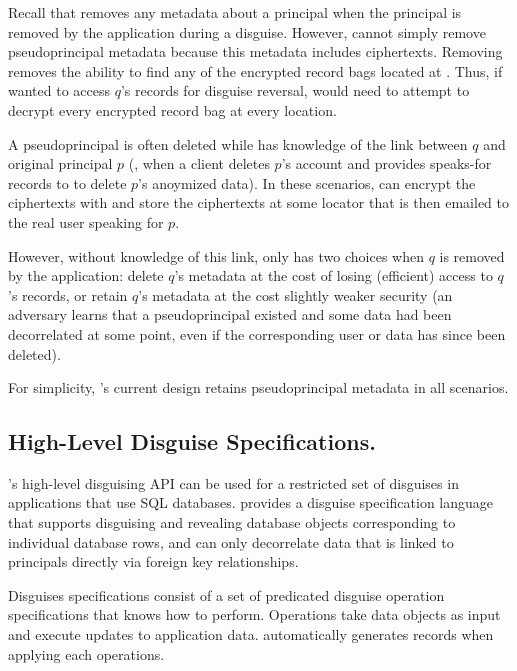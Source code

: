 
Recall that \sys removes any metadata about a principal when the principal is removed by the
application during a disguise.
However, \sys cannot simply remove pseudoprincipal metadata because this metadata includes 
ciphertexts. Removing  removes the ability to find any of the encrypted record bags
located at . Thus, if \sys wanted to access $q$'s records for \eg disguise reversal, \sys
would need to attempt to decrypt every encrypted record bag at every location.

A pseudoprincipal is often deleted while \sys has knowledge of the link between $q$ and
original principal $p$ (\eg, when a client deletes $p$'s account and provides speaks-for records
to \sys to delete $p$'s anoymized data). In these scenarios, \sys can encrypt the
 ciphertexts with  and store the ciphertexts at some locator that is then emailed
to the real user speaking for $p$.

However, without knowledge of this link, \sys only has two choices when $q$ is removed by the
application: delete $q$'s metadata at the cost of losing (efficient) access to $q$'s records, or
retain $q$'s metadata at the cost slightly weaker security (an adversary learns that a
pseudoprincipal existed and some data had been decorrelated at some point, even if the corresponding
user or data has since been deleted).

For simplicity, \sys's current design retains pseudoprincipal metadata in all scenarios.

\subsection{High-Level Disguise Specifications.} 
\sys's high-level disguising API can be used for a restricted set of disguises in applications that
use SQL databases. \sys provides a disguise specification language that supports disguising and
revealing database objects corresponding to individual database rows, and can only decorrelate data
that is linked to principals directly via foreign key relationships.

Disguises specifications consist of a set of predicated disguise operation specifications that \sys knows
how to perform.  Operations take data objects as input and execute updates to
application data. \sys automatically generates records when applying each operations.

